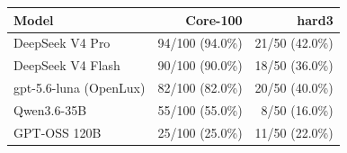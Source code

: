 \begin{tabular}{lrr}
\toprule
\textbf{Model} & \textbf{Core-100} & \textbf{hard3} \\
\midrule
DeepSeek V4 Pro & 94/100 (94.0\%) & 21/50 (42.0\%) \\
DeepSeek V4 Flash & 90/100 (90.0\%) & 18/50 (36.0\%) \\
gpt-5.6-luna (OpenLux) & 82/100 (82.0\%) & 20/50 (40.0\%) \\
Qwen3.6-35B & 55/100 (55.0\%) & 8/50 (16.0\%) \\
GPT-OSS 120B & 25/100 (25.0\%) & 11/50 (22.0\%) \\
\bottomrule
\end{tabular}
